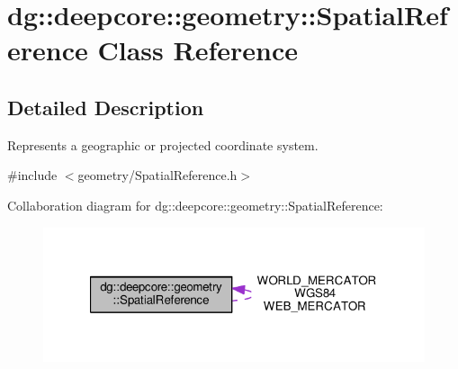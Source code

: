 \hypertarget{classdg_1_1deepcore_1_1geometry_1_1_spatial_reference}{}\section{dg\+:\+:deepcore\+:\+:geometry\+:\+:Spatial\+Reference Class Reference}
\label{classdg_1_1deepcore_1_1geometry_1_1_spatial_reference}


\subsection{Detailed Description}
Represents a geographic or projected coordinate system. 

{\ttfamily \#include $<$geometry/\+Spatial\+Reference.\+h$>$}



Collaboration diagram for dg\+:\+:deepcore\+:\+:geometry\+:\+:Spatial\+Reference\+:
\nopagebreak
\begin{figure}[H]
\begin{center}
\leavevmode
\includegraphics[width=321pt]{classdg_1_1deepcore_1_1geometry_1_1_spatial_reference__coll__graph}
\end{center}
\end{figure}
